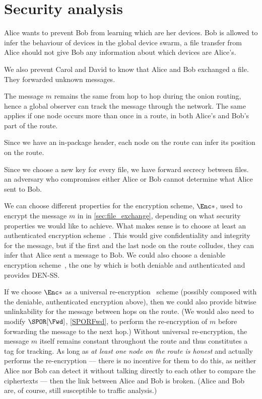 \section{Security analysis}%
\label{SecurityAnalysis}


Alice wants to prevent Bob from learning which are her devices. Bob is allowed 
to infer the behaviour of devices in the global device swarm, a file transfer 
from Alice should not give Bob any information about which devices are Alice's.

We also prevent Carol and David to know that Alice and Bob exchanged a file. 
They forwarded unknown messages.

The message \(m\) remains the same from hop to hop during the onion routing, 
hence a global observer can track the message through the network.
The same applies if one node occurs more than once in a route, \eg in both 
Alice's and Bob's part of the route.

Since we have an in-package header, each node on the route can infer its 
position on the route.

Since we choose a new key for every file, we have forward secrecy between files.
\Eg an adversary who compromises either Alice or Bob cannot determine what Alice 
sent to Bob.

We can choose different properties for the encryption scheme, \(\Enc*\), used to 
encrypt the message \(m\) in in \cref{sec:file_exchange}, depending on what 
security properties we would like to achieve.
What makes sense is to choose at least an authenticated encryption 
scheme~\cite{AuthEncryption}.
This would give confidentiality and integrity for the message, but if the first 
and the last node on the route colludes, they can infer that Alice sent a 
message to Bob.
We could also choose a deniable encryption scheme~\cite{DeniableEncryption}, \eg 
the one by \textcite{OTPKX} which is both deniable and authenticated and 
provides \ac{DEN-SS}.

If we choose \(\Enc*\) as a universal re-encryption~\cite{UniversalReencryption} 
scheme (possibly composed with the deniable, authenticated encryption above), 
then we could also provide bitwise unlinkability for the message between hops on 
the route.
(We would also need to modify \(\SPOR[\Fwd]\), \cref{SPORFwd}, to perform the 
re-encryption of \(m\) before forwarding the message to the next hop.)
Without universal re-encryption, the message \(m\) itself remains constant 
throughout the route and thus constitutes a tag for tracking.
As long as \emph{at least one node on the route is honest} and actually performs 
the re-encryption --- there is no incentive for them to do this, as neither 
Alice nor Bob can detect it without talking directly to each other to compare 
the ciphertexts --- then the link between Alice and Bob is broken.
(Alice and Bob are, of course, still susceptible to traffic analysis.)

